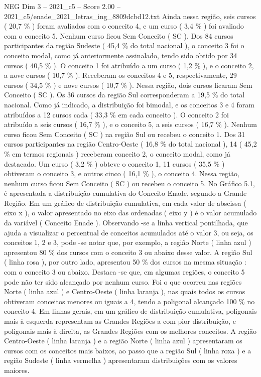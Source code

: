 \begin{textsample}{NEG Dim 3 – 2021\_c5 – Score 2.00 – 2021\_c5/enade\_2021\_letras\_ing\_8809dcbd12.txt}
Ainda nessa região, seis cursos ( 20,7 \% ) foram avaliados com o conceito 4, e um curso ( 3,4 \% ) foi avaliado com o conceito 5.
Nenhum curso ficou Sem Conceito ( SC ).
Dos 84 cursos participantes da região Sudeste ( 45,4 \% do total nacional ), o conceito 3 foi o conceito modal, como já anteriormente assinalado, tendo sido obtido por 34 cursos ( 40,5 \% ).
O conceito 1 foi atribuído a um curso ( 1,2 \% ), e o conceito 2, a nove cursos ( 10,7 \% ).
Receberam os conceitos 4 e 5, respectivamente, 29 cursos ( 34,5 \% ) e nove cursos ( 10,7 \% ).
Nessa região, dois cursos ficaram Sem Conceito ( SC ).
Os 36 cursos da região Sul corresponderam a 19,5 \% do total nacional.
Como já indicado, a distribuição foi bimodal, e os conceitos 3 e 4 foram atribuídos a 12 cursos cada ( 33,3 \% em cada conceito ).
O conceito 2 foi atribuído a seis cursos ( 16,7 \% ), e o conceito 5, a seis cursos ( 16,7 \% ).
Nenhum curso ficou Sem Conceito ( SC ) na região Sul ou recebeu o conceito 1.
Dos 31 cursos participantes na região Centro-Oeste ( 16,8 \% do total nacional ), 14 ( 45,2 \% em termos regionais ) receberam conceito 2, o conceito modal, como já destacado.
Um curso ( 3,2 \% ) obteve o conceito 1, 11 cursos ( 35,5 \% ) obtiveram o conceito 3, e outros cinco ( 16,1 \% ), o conceito 4.
Nessa região, nenhum curso ficou Sem Conceito ( SC ) ou recebeu o conceito 5.
No Gráfico 5.1, é apresentada a distribuição cumulativa do Conceito Enade, segundo a Grande Região.
Em um gráfico de distribuição cumulativa, em cada valor de abscissa ( eixo x ), o valor apresentado no eixo das ordenadas ( eixo y ) é o valor acumulado da variável ( Conceito Enade ).
Observando -se a linha vertical pontilhada, que ajuda a visualizar o percentual de conceitos acumulados até o valor 3, ou seja, os conceitos 1, 2 e 3, pode -se notar que, por exemplo, a região Norte ( linha azul ) apresentou 80 \% dos cursos com o conceito 3 ou abaixo desse valor.
A região Sul ( linha rosa ), por outro lado, apresentou 50 \% dos cursos na mesma situação : com o conceito 3 ou abaixo.
Destaca -se que, em algumas regiões, o conceito 5 pode não ter sido alcançado por nenhum curso.
Foi o que ocorreu nas regiões Norte ( linha azul ) e Centro-Oeste ( linha laranja ), nas quais todos os cursos obtiveram conceitos menores ou iguais a 4, tendo a poligonal alcançado 100 \% no conceito 4.
Em linhas gerais, em um gráfico de distribuição cumulativa, poligonais mais à esquerda representam as Grandes Regiões a com pior distribuição, e poligonais mais à direita, as Grandes Regiões com os melhores conceitos.
A região Centro-Oeste ( linha laranja ) e a região Norte ( linha azul ) apresentaram os cursos com os conceitos mais baixos, ao passo que a região Sul ( linha roxa ) e a região Sudeste ( linha vermelha ) apresentaram distribuições com os valores maiores.

\end{textsample}
